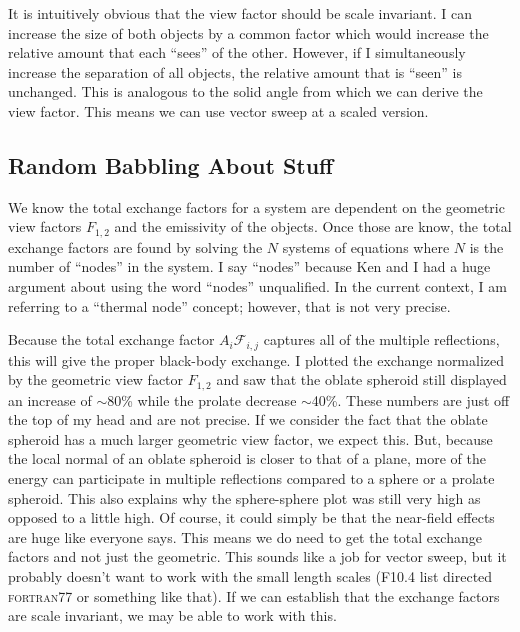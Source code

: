 It is intuitively obvious that the view factor should be scale
invariant.  I can increase the size of both objects by a common factor
which would increase the relative amount that each ``sees'' of the
other.  However, if I simultaneously increase the separation of all
objects, the relative amount that is ``seen'' is unchanged.  This is
analogous to the solid angle from which we can derive the view factor.
This means we can use vector sweep at a scaled version.

\subsection{Random Babbling About Stuff}
We know the total exchange factors for a system are dependent on the
geometric view factors \(F_{1,2}\) and the emissivity of the objects.
Once those are know, the total exchange factors are found by solving the
\(N\) systems of equations where \(N\) is the number of ``nodes'' in the
system.  I say ``nodes'' because Ken and I had a huge argument about
using the word ``nodes'' unqualified.  In the current context, I am
referring to a ``thermal node'' concept; however, that is not very
precise. 

Because the total exchange factor \(A_i\mathcal{F}_{i,j}\) captures all
of the multiple reflections, this will give the proper black-body
exchange.  I plotted the exchange normalized by the geometric view
factor \(F_{1,2}\) and saw that the oblate spheroid still displayed an
increase of \(\sim\)80\% while the prolate decrease \(\sim\)40\%.  These
numbers are just off the top of my head and are not precise.  If we
consider the fact that the oblate spheroid has a much larger geometric
view factor, we expect this.  But, because the local normal of an oblate
spheroid is closer to that of a plane, more of the energy can
participate in multiple reflections compared to a sphere or a prolate
spheroid.  This also explains why the sphere-sphere plot was still very
high as opposed to a little high.  Of course, it could simply be that
the near-field effects are huge like everyone says.  This means we do
need to get the total exchange factors and not just the geometric.  This
sounds like a job for vector sweep, but it probably doesn't want to work
with the small length scales (\textsc{F10.4} list directed
\textsc{fortran77} or something like that).  If we can establish that
the exchange factors are scale invariant, we may be able to work with
this.

